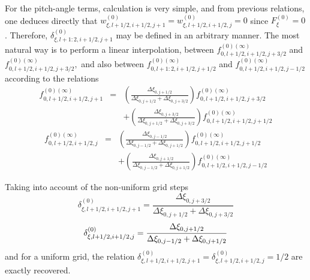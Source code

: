 For the pitch-angle terms, calculation is very simple, and from previous
relations, one deduces directly that $w_{\xi ,l+1/2,i+1/2,j+1}^{\left(
0\right) }=w_{\xi ,l+1/2,i+1/2,j}^{\left( 0\right) }=0$ since $F_{\xi
}^{\left( 0\right) }=0$. Therefore, $\delta _{\xi ,l+1:2,i+1/2,j+1}^{\left(
0\right) }$ may be defined in an arbitrary manner. The most natural way is
to perform a linear interpolation, between $f_{0,l+1/2,i+1/2,j+3/2}^{\left(
0\right) (\infty )}$ and $f_{0,l+1/2,i+1/2,j+3/2}^{\left( 0\right) (\infty
)},$ and also between $f_{0,l+1:2,i+1/2,j+1/2}^{\left( 0\right) (\infty )}$
and $f_{0,l+1/2,i+1/2,j-1/2}^{\left( 0\right) (\infty )}$ according to the
relations
\begin{eqnarray}
f_{0,l+1/2,i+1/2,j+1}^{\left( 0\right) (\infty )} &=&\left( \frac{\Delta \xi
_{0,j+1/2}}{\Delta \xi _{0,j+1/2}+\Delta \xi _{0,j+3/2}}\right)
f_{0,l+1/2,i+1/2,j+3/2}^{\left( 0\right) (\infty )}  \nonumber \\
&&+\left( \frac{\Delta \xi _{0,j+3/2}}{\Delta \xi _{0,j+1/2}+\Delta \xi
_{0,j+3/2}}\right) f_{0,l+1/2,i+1/2,j+1/2}^{\left( 0\right) (\infty )}
\end{eqnarray}
\begin{eqnarray}
f_{0,l+1/2,i+1/2,j}^{\left( 0\right) (\infty )} &=&\left( \frac{\Delta \xi
_{0,j-1/2}}{\Delta \xi _{0,j-1/2}+\Delta \xi _{0,j+1/2}}\right)
f_{0,l+1/2,i+1/2,j+1/2}^{\left( 0\right) (\infty )}  \nonumber \\
&&+\left( \frac{\Delta \xi _{0,j+1/2}}{\Delta \xi _{0,j-1/2}+\Delta \xi
_{0,j+1/2}}\right) f_{0,l+1/2,i+1/2,j-1/2}^{\left( 0\right) (\infty )}
\end{eqnarray}

Taking into account of the non-uniform grid steps
\begin{equation}
\delta _{\xi ,l+1/2,i+1/2,j+1}^{\left( 0\right) }=\frac{\Delta \xi _{0,j+3/2}%
}{\Delta \xi _{0,j+1/2}+\Delta \xi _{0,j+3/2}}
\end{equation}
\begin{equation}
\delta _{\xi ,l+1/2,i+1/2,j}^{\left( 0\right) }=\frac{\Delta \xi _{0,j+1/2}}{%
\Delta \xi _{0,j-1/2}+\Delta \xi _{0,j+1/2}}
\end{equation}
and for a uniform grid, the relation $\delta _{\xi ,l+1/2,i+1/2,j+1}^{\left(
0\right) }=\delta _{\xi ,l+1/2,i+1/2,j}^{\left( 0\right) }=1/2$ are exactly
recovered.

